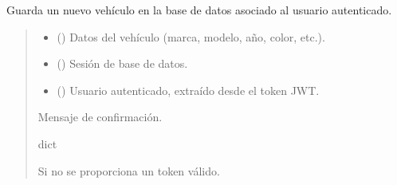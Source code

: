 \documentclass[letterpaper,10pt,spanish]{sphinxmanual}
\begin{document}
\begin{fulllineitems}
\label{\detokenize{modelos:main.guardar_vehiculo}}
\pysigstartsignatures
\pysiglinewithargsret
{}
{\sphinxparamcomma {}\sphinxparamcomma {}}
{}
\pysigstopsignatures
\sphinxAtStartPar
Guarda un nuevo vehículo en la base de datos asociado al usuario autenticado.
\begin{quote}\begin{description}
\begin{itemize}
\item {} 
\sphinxAtStartPar
{} () \textendash{} Datos del vehículo (marca, modelo, año, color, etc.).

\item {} 
\sphinxAtStartPar
{} () \textendash{} Sesión de base de datos.

\item {} 
\sphinxAtStartPar
{} ({\hyperref[\detokenize{modelos:main.Usuario}]{}}) \textendash{} Usuario autenticado, extraído desde el token JWT.

\end{itemize}

\sphinxAtStartPar
Mensaje de confirmación.

\sphinxAtStartPar
dict

\sphinxAtStartPar
{} \textendash{} Si no se proporciona un token válido.

\end{description}\end{quote}

\end{fulllineitems}
\end{document}
